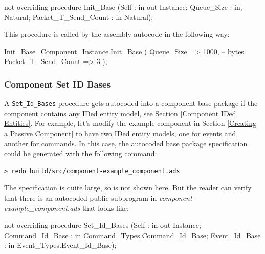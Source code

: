 \vspace{5mm} %
\begin{adacode}
  not overriding procedure Init_Base (Self : in out Instance; Queue_Size : in, Natural; Packet_T_Send_Count : in Natural);
\end{adacode}
\vspace{5mm} %

This procedure is called by the assembly autocode in the following way:

\vspace{5mm} %
\begin{adacode}
  Init_Base_Component_Instance.Init_Base (
    Queue_Size => 1000,         -- bytes
    Packet_T_Send_Count => 3 
  );
\end{adacode}
\vspace{5mm} %

\subsubsection{Component Set ID Bases} \label{Component Set ID Bases}

A \texttt{Set\_Id\_Bases} procedure gets autocoded into a component base package if the component contains any IDed entity model, see Section \ref{Component IDed Entities}. For example, let's modify the example component in Section \ref{Creating a Passive Component} to have two IDed entity models, one for events and another for commands. In this case, the autocoded base package specification could be generated with the following command:

\vspace{5mm} %
\begin{verbatim}
> redo build/src/component-example_component.ads
\end{verbatim}
\vspace{5mm} %

The specification is quite large, so is not shown here. But the reader can verify that there is an autocoded public subprogram in \textit{component-example\_component.ads} that looks like:

\vspace{5mm} %
\begin{adacode}
not overriding procedure Set_Id_Bases (Self : in out Instance; Command_Id_Base : in Command_Types.Command_Id_Base; Event_Id_Base : in Event_Types.Event_Id_Base);
\end{adacode}
\vspace{5mm} %

